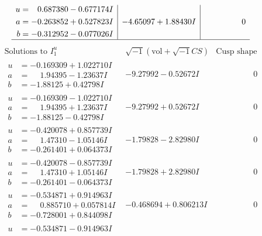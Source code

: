 \documentclass[1p]{elsarticle_modified}
\theoremstyle{definition}
\newcommand{\I}{\sqrt{-1}}
\begin{document}
$$\begin{array}{c|c|c}
\begin{aligned}
u &= \phantom{-}0.687380 - 0.677174 I \\
a &= -0.263852 + 0.527823 I \\
b &= -0.312952 - 0.077026 I\end{aligned}
 & -4.65097 + 1.88430 I & \phantom{-0.000000 } 0\\
 \hline 
 \end{array}$$\newpage$$\begin{array}{c|c|c}  
\text{Solutions to }I^u_{1}& \I (\text{vol} + \sqrt{-1}CS) & \text{Cusp shape}\\
 \hline 
\begin{aligned}
u &= -0.169309 + 1.022710 I \\
a &= \phantom{-}1.94395 - 1.23637 I \\
b &= -1.88125 + 0.42798 I\end{aligned}
 & -9.27992 - 0.52672 I & \phantom{-0.000000 } 0 \\ \hline\begin{aligned}
u &= -0.169309 - 1.022710 I \\
a &= \phantom{-}1.94395 + 1.23637 I \\
b &= -1.88125 - 0.42798 I\end{aligned}
 & -9.27992 + 0.52672 I & \phantom{-0.000000 } 0 \\ \hline\begin{aligned}
u &= -0.420078 + 0.857739 I \\
a &= \phantom{-}1.47310 - 1.05146 I \\
b &= -0.261401 + 0.064373 I\end{aligned}
 & -1.79828 - 2.82980 I & \phantom{-0.000000 } 0 \\ \hline\begin{aligned}
u &= -0.420078 - 0.857739 I \\
a &= \phantom{-}1.47310 + 1.05146 I \\
b &= -0.261401 - 0.064373 I\end{aligned}
 & -1.79828 + 2.82980 I & \phantom{-0.000000 } 0 \\ \hline\begin{aligned}
u &= -0.534871 + 0.914963 I \\
a &= \phantom{-}0.885710 + 0.057814 I \\
b &= -0.728001 + 0.844098 I\end{aligned}
 & -0.468694 + 0.806213 I & \phantom{-0.000000 } 0 \\ \hline\begin{aligned}
u &= -0.534871 - 0.914963 I \\

\end{aligned}
\end{array}$$
\end{document}
